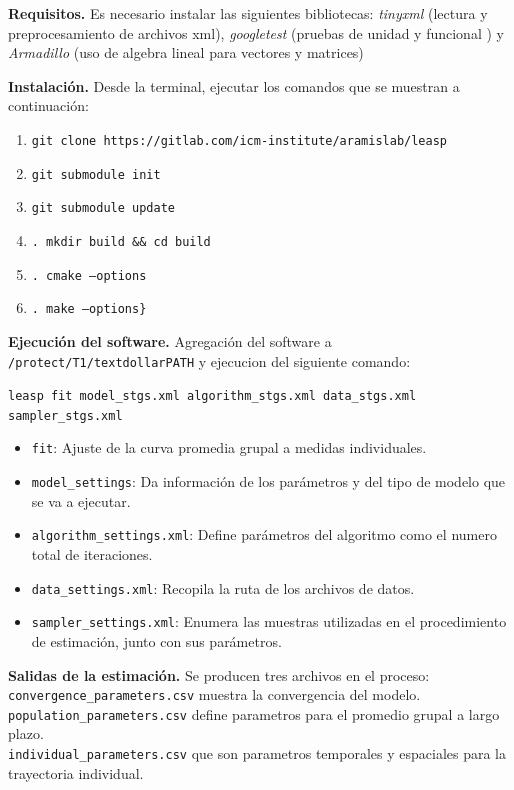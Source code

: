 	\begin{description}
		\item {\textbf{Requisitos.}} Es necesario instalar las siguientes bibliotecas:
		\textit{tinyxml} (lectura y preprocesamiento de archivos xml),
		\textit{googletest} (pruebas de unidad y funcional ) y  \textit{Armadillo} (uso
		de algebra lineal para vectores y matrices) 
		
		\item {\textbf{Instalación.}} Desde la terminal, ejecutar los comandos que se
		muestran a continuación:
		\begin{enumerate}
			\item \texttt{git clone https://gitlab.com/icm-institute/aramislab/leasp}
			\item \texttt{git submodule init}
			\item \texttt{git submodule update}
			\item \texttt{. mkdir build \&\& cd build}
			\item \texttt{. cmake --options}
			\item \texttt{. make --options\}}
		\end{enumerate}
		
		\item {\textbf{Ejecución del software.}} Agregación del software a
		\texttt{/protect/T1/textdollarPATH} y ejecucion del siguiente comando:
		\begin{center}
			\texttt{leasp fit model\_stgs.xml algorithm\_stgs.xml data\_stgs.xml sampler\_stgs.xml}
		\end{center}
		
		\begin{itemize}
			\item \texttt{fit}: Ajuste de la curva promedia grupal a medidas individuales.
			\item \texttt{model\_settings}: Da información de los parámetros y del tipo de modelo	que se va a ejecutar.
			\item \texttt{algorithm\_settings.xml}: Define parámetros del algoritmo como el numero total de iteraciones.
			\item \texttt{data\_settings.xml}: Recopila la ruta de los archivos de datos.
			\item \texttt{sampler\_settings.xml}: Enumera las muestras utilizadas en el procedimiento de estimación, junto con sus parámetros.
		\end{itemize}
		
		\item {\textbf{Salidas de la estimación.}} Se producen tres archivos en el proceso: \\
		\texttt{convergence\_parameters.csv} muestra la convergencia del modelo.\\ \texttt{population\_parameters.csv} define parametros para el promedio grupal a largo plazo.\\ \texttt{individual\_parameters.csv} que son parametros temporales y espaciales para la trayectoria individual.
	\end{description}
	

